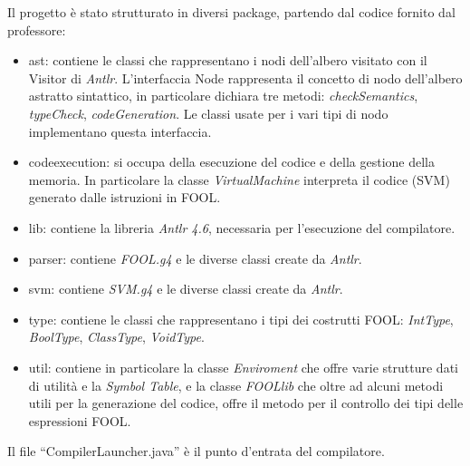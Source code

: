 \documentclass{scrreprt}
\begin{document}
Il progetto è stato strutturato in diversi package, partendo dal codice fornito dal professore:
\begin{itemize}
    \item ast: contiene le classi che rappresentano i nodi dell'albero visitato con il Visitor di \textit{Antlr}. 
            L'interfaccia Node rappresenta il concetto di nodo dell'albero astratto sintattico, in particolare dichiara tre metodi:
            \textit{checkSemantics}, \textit{typeCheck}, \textit{codeGeneration}. Le classi usate per i vari tipi di nodo implementano questa interfaccia.
    \item codeexecution: si occupa della esecuzione del codice e della gestione della memoria. In particolare la classe \textit{VirtualMachine} interpreta il codice (SVM) generato dalle istruzioni in FOOL.
    \item lib: contiene la libreria \textit{Antlr 4.6}, necessaria per l'esecuzione del compilatore.
    \item parser: contiene \textit{FOOL.g4} e le diverse classi create da \textit{Antlr}.
    \item svm:  contiene \textit{SVM.g4} e le diverse classi create da \textit{Antlr}.
    \item type: contiene le classi che rappresentano i tipi dei costrutti FOOL: \textit{IntType}, \textit{BoolType}, \textit{ClassType}, \textit{VoidType}.
    \item util: contiene in particolare la classe \textit{Enviroment} che offre varie strutture dati di utilità e la \textit{Symbol Table}, e la classe \textit{FOOLlib} che oltre ad alcuni metodi utili
            per la generazione del codice, offre il metodo  per il controllo dei tipi delle espressioni FOOL.
\end{itemize}

Il file ``CompilerLauncher.java'' è il punto d'entrata del compilatore.
\end{document}
